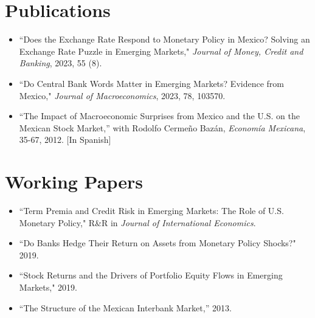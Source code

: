 \documentclass[12pt]{article}
\newcommand{\vsect}{\vspace{0.08cm}}
\begin{document}
	
	\section{Publications} 
	\vsect
	\begin{itemize}[label={},itemindent=-2em,leftmargin=2em,noitemsep,topsep=0pt]
		\item ``Does the Exchange Rate Respond to Monetary Policy in Mexico? Solving an Exchange Rate Puzzle in Emerging Markets," \textit{Journal of Money, Credit and Banking}, 2023, 55 (8). %
		\item ``Do Central Bank Words Matter in Emerging Markets? Evidence from Mexico," \textit{Journal of Macroeconomics}, 2023, 78, 103570.
		\item ``The Impact of Macroeconomic Surprises from Mexico and the U.S. on the Mexican Stock Market,” with Rodolfo Cermeño Bazán, \textit{Economía Mexicana}, 35-67, 2012. [In Spanish]
	\end{itemize}
	
	
	\section{Working Papers}
	\vsect
	\begin{itemize}[label={},itemindent=-2em,leftmargin=2em,noitemsep,topsep=0pt]
		\item ``Term Premia and Credit Risk in Emerging Markets: The Role of U.S. Monetary Policy," R\&R in \textit{Journal of International Economics}. %
	\item ``Do Banks Hedge Their Return on Assets from Monetary Policy Shocks?" 2019.
	\item ``Stock Returns and the Drivers of Portfolio Equity Flows in Emerging Markets," 2019.
	\item ``The Structure of the Mexican Interbank Market,” 2013.
	\end{itemize}
	
	\pagestyle{fancy}
	
\end{document}
